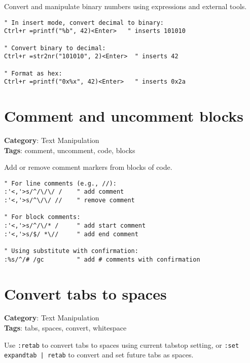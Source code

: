 {{{{{{{{{{{{{Convert and manipulate binary numbers using expressions and external tools.

\begin{Exa*}{}
\begin{Verbatim}[fontsize=\footnotesize, breaklines, breakanywhere]
" In insert mode, convert decimal to binary:
Ctrl+r =printf("%b", 42)<Enter>   " inserts 101010

" Convert binary to decimal:
Ctrl+r =str2nr("101010", 2)<Enter>  " inserts 42

" Format as hex:
Ctrl+r =printf("0x%x", 42)<Enter>   " inserts 0x2a
\end{Verbatim}
\end{Exa*}

\section{Comment and uncomment blocks}

\textbf{Category}: Text Manipulation\\ \textbf{Tags}: comment, uncomment, code, blocks
\vspace{0.5cm}

Add or remove comment markers from blocks of code.

\begin{Exa*}{}
\begin{Verbatim}[fontsize=\footnotesize, breaklines, breakanywhere]
" For line comments (e.g., //):
:'<,'>s/^/\/\/ /    " add comment
:'<,'>s/^\/\/ //    " remove comment

" For block comments:
:'<,'>s/^/\/* /     " add start comment
:'<,'>s/$/ *\//     " add end comment

" Using substitute with confirmation:
:%s/^/# /gc         " add # comments with confirmation
\end{Verbatim}
\end{Exa*}

\section{Convert tabs to spaces}

\textbf{Category}: Text Manipulation\\ \textbf{Tags}: tabs, spaces, convert, whitespace
\vspace{0.5cm}

Use {\footnotesize \Verb§:retab§} to convert tabs to spaces using current tabstop setting, or {\footnotesize \Verb§:set expandtab | retab§} to convert and set future tabs as spaces.

}}}}}}}}}}}}}
